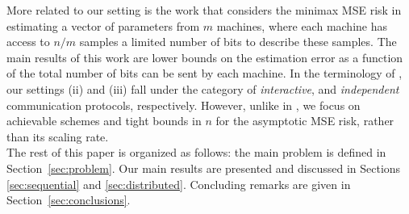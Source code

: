\documentclass[letterpaper, conference]{IEEEtran}      %
\begin{document}
%
More related to our setting is the work \cite{zhang2013information} that considers the minimax MSE risk in estimating a vector of parameters from $m$ machines, where each machine has access to $n/m$ samples a limited number of bits to describe these samples. The main results of this work are lower bounds on the estimation error as a function of the total number of bits can be sent by each machine. In the terminology of \cite{zhang2013information}, our settings (ii) and (iii) fall under the category of \emph{interactive}, and  \emph{independent} communication protocols, respectively. %
However, unlike in \cite{zhang2013information}, we focus on achievable schemes and tight bounds in $n$ for the asymptotic MSE risk, rather than its scaling rate. \\

The rest of this paper is organized as follows: the main problem is defined in Section~\ref{sec:problem}. Our main results are presented and discussed in Sections~ \ref{sec:sequential} and \ref{sec:distributed}. Concluding remarks are given in Section~\ref{sec:conclusions}.



\end{document}
